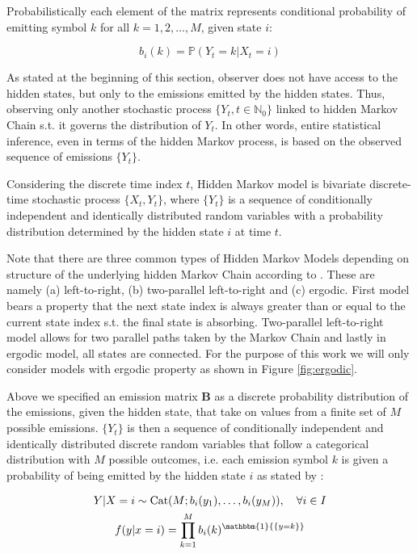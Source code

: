 Probabilistically each element of the matrix represents conditional probability of emitting symbol $k$ for all $k = 1,2,\ldots,M$, given state $i$: 

\begin{equation}
    b_{i}(k) = \mathbb{P}(Y_t = k|X_t = i) 
\end{equation}

As stated at the beginning of this section, observer does not have access to the hidden states, but only to the emissions emitted by the hidden states. 
Thus, observing only another stochastic process $\{Y_t, t \in \mathbb{N}_0\}$ linked to hidden Markov Chain s.t. it governs the distribution of $Y_t$. 
In other words, entire statistical inference, even in terms of the hidden Markov process, is based on the observed sequence of emissions $\{Y_t\}$.

Considering the discrete time index $t$, Hidden Markov model is bivariate discrete-time stochastic process $\{X_t,Y_t\}$, where $\{Y_t\}$ is a sequence of conditionally 
independent and identically distributed random variables with a probability distribution determined by the hidden state $i$ at time $t$. \citep{Rabiner1989}

Note that there are three common types of Hidden Markov Models depending on structure of the underlying hidden Markov Chain according to \citep{Nelwamondo2006}. These are namely (a) left-to-right, 
(b) two-parallel left-to-right and (c) ergodic. First model bears a property that the next state index is always greater than or equal to the current state index s.t. the final state is absorbing.
Two-parallel left-to-right model allows for two parallel paths taken by the Markov Chain and lastly in ergodic model, all states are connected.
For the purpose of this work we will only consider models with ergodic property as shown in Figure \ref{fig:ergodic}.

Above we specified an emission matrix $\textbf{B}$ as a discrete probability distribution of the emissions, given the hidden state, that take on values from a finite set of $M$ possible emissions. $\{Y_t\}$ is then a sequence of conditionally 
independent and identically distributed discrete random variables that follow a categorical distribution with $M$ possible outcomes, i.e. each emission symbol $k$ is given a probability of being emitted by the hidden state $i$
 as stated by \citep{Paisley2009}:

\begin{gather}
    Y | X = i \sim \text{Cat}(M;b_i(y_1),\ldots,b_i(y_M)), \quad \forall i \in I \\
    f(y|x=i) = \prod\limits_{k=1}^M b_i(k)^{\mathbbm{1}{\{y=k\}}}
\end{gather}
 
